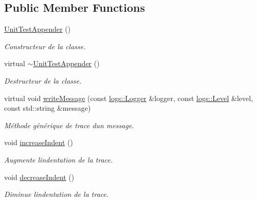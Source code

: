 \subsection*{Public Member Functions}
\begin{DoxyCompactItemize}
\item 
\mbox{\label{classUnitTestAppender_a1c7d981379814dd2f678d766644fe047}} 
\hyperlink{classUnitTestAppender_a1c7d981379814dd2f678d766644fe047}{Unit\+Test\+Appender} ()
\begin{DoxyCompactList}\small\item\em Constructeur de la classe. \end{DoxyCompactList}\item 
\mbox{\label{classUnitTestAppender_a709f7028bb1c3d32bd4524b3266bfdf3}} 
virtual \hyperlink{classUnitTestAppender_a709f7028bb1c3d32bd4524b3266bfdf3}{$\sim$\+Unit\+Test\+Appender} ()
\begin{DoxyCompactList}\small\item\em Destructeur de la classe. \end{DoxyCompactList}\item 
virtual void \hyperlink{classUnitTestAppender_a2b69943419d6fe74a7f8a9c6cdcd0c98}{write\+Message} (const \hyperlink{classlogs_1_1Logger}{logs\+::\+Logger} \&logger, const \hyperlink{classlogs_1_1Level}{logs\+::\+Level} \&level, const std\+::string \&message)
\begin{DoxyCompactList}\small\item\em Méthode générique de trace d\textquotesingle{}un message. \end{DoxyCompactList}\item 
\mbox{\label{classUnitTestAppender_a8142469443969a4e2c75820ef033c9cc}} 
void \hyperlink{classUnitTestAppender_a8142469443969a4e2c75820ef033c9cc}{increase\+Indent} ()
\begin{DoxyCompactList}\small\item\em Augmente l\textquotesingle{}indentation de la trace. \end{DoxyCompactList}\item 
\mbox{\label{classUnitTestAppender_a64063acb53860350f1efc8fe5e408ae9}} 
void \hyperlink{classUnitTestAppender_a64063acb53860350f1efc8fe5e408ae9}{decrease\+Indent} ()
\begin{DoxyCompactList}\small\item\em Diminue l\textquotesingle{}indentation de la trace. \end{DoxyCompactList}\item 

\end{DoxyCompactItemize}
